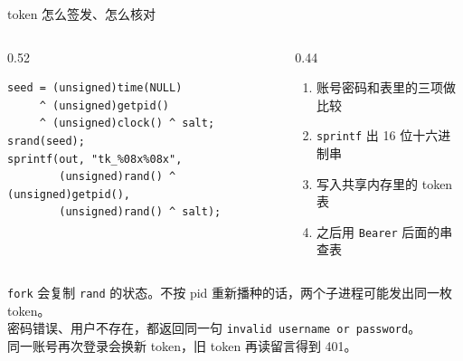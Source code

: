 \documentclass[aspectratio=169,11pt,professionalfonts]{ctexbeamer}
\begin{document}
\begin{frame}[fragile]{token 怎么签发、怎么核对}
\begin{columns}[T,onlytextwidth]
\begin{column}{0.52\textwidth}
\begin{lstlisting}[style=snippet]
seed = (unsigned)time(NULL)
     ^ (unsigned)getpid()
     ^ (unsigned)clock() ^ salt;
srand(seed);
sprintf(out, "tk_%08x%08x",
        (unsigned)rand() ^ (unsigned)getpid(),
        (unsigned)rand() ^ salt);
\end{lstlisting}
\end{column}
\begin{column}{0.44\textwidth}
\begin{enumerate}
  \item 账号密码和表里的三项做比较
  \item \texttt{sprintf} 出 16 位十六进制串
  \item 写入共享内存里的 token 表
  \item 之后用 \texttt{Bearer} 后面的串查表
\end{enumerate}
\end{column}
\end{columns}
\vspace{0.25em}
{\small \texttt{fork} 会复制 \texttt{rand} 的状态。不按 pid 重新播种的话，两个子进程可能发出同一枚 token。\\
密码错误、用户不存在，都返回同一句 \texttt{invalid username or password}。\\
同一账号再次登录会换新 token，旧 token 再读留言得到 401。}
\end{frame}
\end{document}
